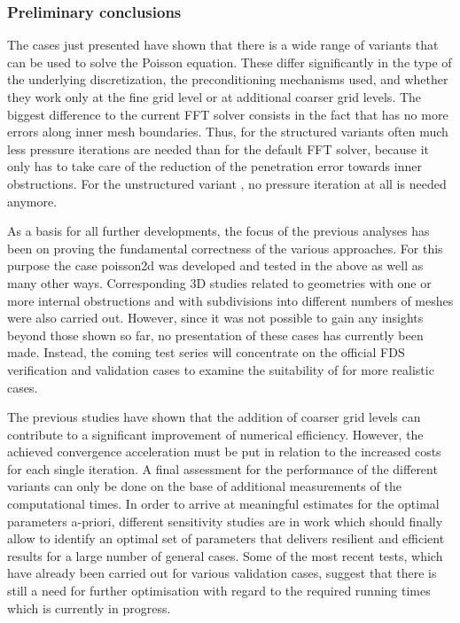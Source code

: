 \subsubsection{Preliminary conclusions}
\label{SEC_SCARC_poisson_evaluation}
The cases just presented have shown that there is a wide range of \scarc{} variants that can be used to solve the Poisson equation. These differ significantly in the type of the underlying discretization, the preconditioning mechanisms used, and whether they work only at the fine grid level or at additional coarser grid levels. The biggest difference to the current FFT solver consists in the fact that \scarc{} has no more errors along inner mesh boundaries. Thus, for the structured \scarc{} variants often much less pressure iterations are needed than for the default FFT solver, because it only has to take care of the reduction of the penetration error towards inner obstructions. For the unstructured variant \uscarc{}, no pressure iteration at all is needed anymore.

As a basis for all further developments, the focus of the previous analyses has been on proving the fundamental correctness of the various \scarc{} approaches. For this purpose the case {\ct poisson2d} was developed and tested in the above as well as many other ways. Corresponding 3D studies related to geometries with one or more internal obstructions and with subdivisions into different numbers of meshes were also carried out. However, since it was not possible to gain any insights beyond those shown so far, no presentation of these cases has currently been made. Instead, the coming test series will concentrate on the official FDS verification and validation cases to examine the suitability of \scarc{} for more realistic cases.

The previous studies have shown that the addition of coarser grid levels can contribute to a significant improvement of numerical efficiency. However, the achieved convergence acceleration must be put in relation to the increased costs for each single iteration.
A final assessment for the performance of the different variants can only be done on the base of additional measurements of the computational times. 
In order to arrive at meaningful estimates for the optimal parameters a-priori, different sensitivity studies are in work which should finally allow to identify an optimal set of parameters that delivers resilient and efficient results for a large number of general cases.
Some of the most recent tests, which have already been carried out for various validation cases, suggest that
there is still a need for further optimisation with regard to the required running times which is currently in progress.

